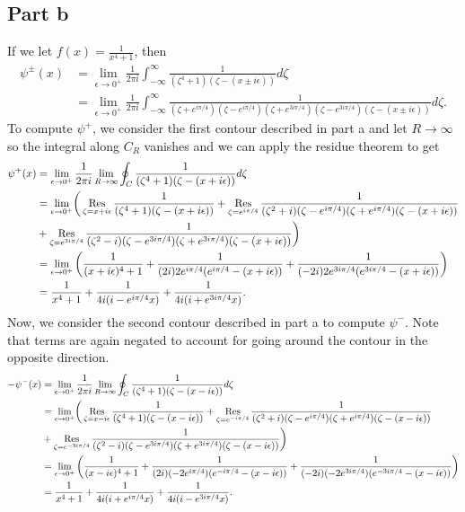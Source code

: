 \documentclass{article}
\begin{document}
\subsection{Part b}
If we let $f(x)=\frac{1}{x^4+1}$, then 
\begin{align*}
\psi^\pm(x)&=\lim_{\epsilon\to0^+}\frac{1}{2\pi i}\int_{-\infty}^\infty\frac{1}{(\zeta^4+1)(\zeta-(x\pm i\epsilon))}d\zeta\\&=
\lim_{\epsilon\to0^+}\frac{1}{2\pi i}\int_{-\infty}^\infty\frac{1}{(\zeta+e^{i\pi/4})(\zeta-e^{i\pi/4})(\zeta+e^{3i\pi/4})(\zeta-e^{3i\pi/4})(\zeta-(x\pm i\epsilon))}d\zeta.
\end{align*}
To compute $\psi^+$, we consider the first contour described in part a and let $R\to\infty$ so the integral along $C_R$ vanishes and we can apply the residue theorem to get
\begin{align*}
\psi^+(x)&=\lim_{\epsilon\to0^+}\frac{1}{2\pi i}\lim_{R\to\infty}\oint_C\frac{1}{(\zeta^4+1)(\zeta-(x+ i\epsilon))}d\zeta\\&=\lim_{\epsilon\to0^+}\biggr(\operatorname*{Res}_{\zeta=x+i\epsilon}\frac{1}{(\zeta^4+1)(\zeta-(x+ i\epsilon))}+\operatorname*{Res}_{\zeta=e^{i\pi/4}}\frac{1}{(\zeta^2+i)(\zeta-e^{i\pi/4})(\zeta+e^{i\pi/4})(\zeta-(x+ i\epsilon))}\\&+\operatorname*{Res}_{\zeta=e^{3i\pi/4}}\frac{1}{(\zeta^2-i)(\zeta-e^{3i\pi/4})(\zeta+e^{3i\pi/4})(\zeta-(x+ i\epsilon))}\biggr)\\&=
\lim_{\epsilon\to0^+}\left(\frac{1}{(x+i\epsilon)^4+1}+\frac{1}{(2i)2e^{i\pi/4}(e^{i\pi/4}-(x+i\epsilon))}+\frac{1}{(-2i)2e^{3i\pi/4}(e^{3i\pi/4}-(x+i\epsilon))}\right)\\&=
\frac{1}{x^4+1}+\frac{1}{4i(i-e^{i\pi/4}x)}+\frac{1}{4i(i+e^{3i\pi/4}x)}.
\end{align*}
Now, we consider the second contour described in part a to compute $\psi^-$. Note that terms are again negated to account for going around the contour in the opposite direction. 
\begin{align*}
-\psi^-(x)&=\lim_{\epsilon\to0^+}\frac{1}{2\pi i}\lim_{R\to\infty}\oint_C\frac{1}{(\zeta^4+1)(\zeta-(x- i\epsilon))}d\zeta\\&=\lim_{\epsilon\to0^+}\biggr(\operatorname*{Res}_{\zeta=x-i\epsilon}\frac{1}{(\zeta^4+1)(\zeta-(x- i\epsilon))}+\operatorname*{Res}_{\zeta=e^{-i\pi/4}}\frac{1}{(\zeta^2+i)(\zeta-e^{i\pi/4})(\zeta+e^{i\pi/4})(\zeta-(x- i\epsilon))}\\&+\operatorname*{Res}_{\zeta=e^{-3i\pi/4}}\frac{1}{(\zeta^2-i)(\zeta-e^{3i\pi/4})(\zeta+e^{3i\pi/4})(\zeta-(x- i\epsilon))}\biggr)\\&=
\lim_{\epsilon\to0^+}\left(\frac{1}{(x-i\epsilon)^4+1}+\frac{1}{(2i)(-2e^{i\pi/4})(e^{-i\pi/4}-(x-i\epsilon))}+\frac{1}{(-2i)(-2e^{3i\pi/4})(e^{-3i\pi/4}-(x-i\epsilon))}\right)\\&=
\frac{1}{x^4+1}+\frac{1}{4i(i+e^{i\pi/4}x)}+\frac{1}{4i(i-e^{3i\pi/4}x)}.
\end{align*}
\end{document}
